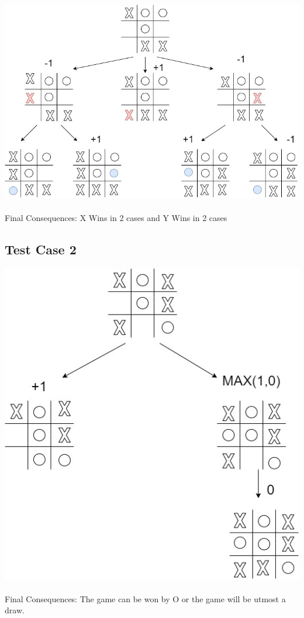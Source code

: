 \documentclass[a4paper, 12pt]{article}
\begin{document}
        \includegraphics[width=\textwidth,height=\textheight,keepaspectratio]{TC1.jpeg}
        \\
        \\
        Final Consequences: X Wins in 2 cases and Y Wins in 2 cases

\subsection{Test Case 2}

        \includegraphics[width=\textwidth,height=\textheight,keepaspectratio]{TC2.jpeg}
        \\
        \\
        Final Consequences: The game can be won by O or the game will be utmost a draw.
\end{document}
